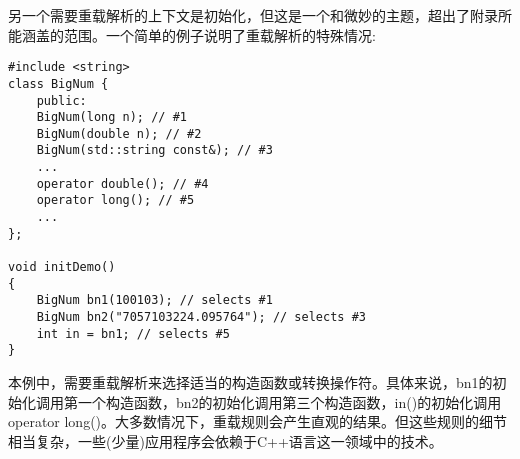 另一个需要重载解析的上下文是初始化，但这是一个和微妙的主题，超出了附录所能涵盖的范围。一个简单的例子说明了重载解析的特殊情况:

\begin{lstlisting}[style=styleCXX]
#include <string>
class BigNum {
	public:
	BigNum(long n); // #1
	BigNum(double n); // #2
	BigNum(std::string const&); // #3
	...
	operator double(); // #4
	operator long(); // #5
	...
};

void initDemo()
{
	BigNum bn1(100103); // selects #1
	BigNum bn2("7057103224.095764"); // selects #3
	int in = bn1; // selects #5
}
\end{lstlisting}

本例中，需要重载解析来选择适当的构造函数或转换操作符。具体来说，bn1的初始化调用第一个构造函数，bn2的初始化调用第三个构造函数，in()的初始化调用operator long()。大多数情况下，重载规则会产生直观的结果。但这些规则的细节相当复杂，一些(少量)应用程序会依赖于C++语言这一领域中的技术。













